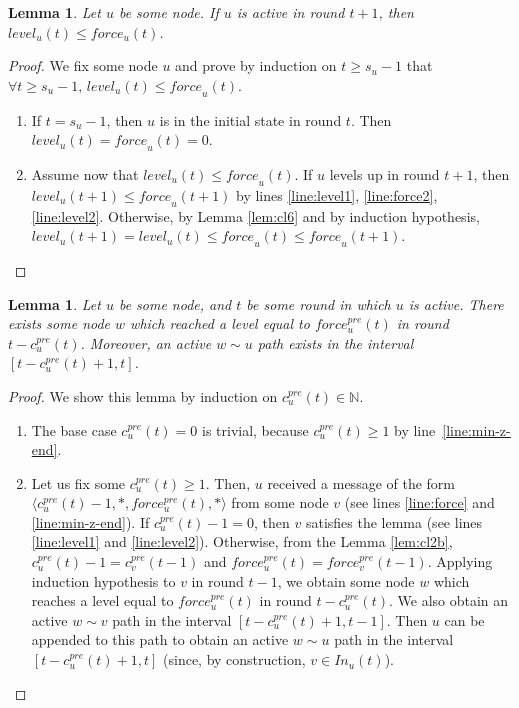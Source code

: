 \documentclass[11pt,letterpaper]{article}
\newtheorem{lem}[thm]{Lemma}
\begin{document}
\begin{lem} \label{lem:greater-force}
	Let $u$ be some node. If $u$ is active in round $t+1$, then $level_u(t) \leq force_u(t)$.
\end{lem}
\begin{proof}
        We fix some node $u$ and prove by induction on $t \geq s_u-1$ that $\forall t \geq s_u-1,\, \mathit{level}_u(t) \leq \mathit{force}_u(t)$.
	\begin{enumerate}
		\item If $t = s_u-1$, then $u$ is in the initial state in round $t$. Then $\mathit{level}_u(t) = \mathit{force}_u(t) = 0$.
		\item Assume now that $\mathit{level}_u(t) \leq \mathit{force}_u(t)$.
			If $u$ levels up in round $t+1$, then $\mathit{level}_u(t+1) \leq \mathit{force}_u(t+1)$ by lines \ref{line:level1}, \ref{line:force2}, \ref{line:level2}.
			Otherwise, by Lemma \ref{lem:cl6} and by induction hypothesis, $\mathit{level}_u(t+1) = \mathit{level}_u(t) \leq \mathit{force}_u(t) \leq \mathit{force}_u(t+1)$.
	\end{enumerate}
\end{proof}

\begin{lem} \label{lem:safety-force}
	Let $u$ be some node, and $t$ be some round in which $u$ is active.
	There exists some node $w$ which reached a level equal to $force_u^{pre}(t)$ in round $t-c_u^{pre}(t)$.
	Moreover, an active $w \sim u$ path exists in the interval $[t-c_u^{pre}(t)+1,t]$.
\end{lem}
\begin{proof}
	We show this lemma by induction on $c_u^{pre}(t) \in \mathds{N}$.
	\begin{enumerate}
		\item The base case $c_u^{pre}(t) = 0$ is trivial, because $c_u^{pre}(t) \geq 1$ by line~\ref{line:min-z-end}.
		\item Let us fix some $c_u^{pre}(t) \geq 1$.
			Then, $u$ received a message of the form $\langle c_u^{pre}(t)-1, *, force_u^{pre}(t), * \rangle$ from some node $v$ (see lines \ref{line:force} and \ref{line:min-z-end}).
			If $c_u^{pre}(t) - 1 = 0$, then $v$ satisfies the lemma (see lines \ref{line:level1} and \ref{line:level2}).
			Otherwise, from the Lemma \ref{lem:cl2b}, $c_u^{pre}(t)-1 = c_v^{pre}(t-1)$ and $force_u^{pre}(t) = force_v^{pre}(t-1)$.
			Applying induction hypothesis to $v$ in round $t-1$, we obtain some node $w$ which reaches a level equal to $force_u^{pre}(t)$ in round $t-c_u^{pre}(t)$.
			We also obtain an active $w \sim v$ path in the interval $[t-c_u^{pre}(t)+1,t-1]$.
			Then $u$ can be appended to this path to obtain an active $w \sim u$ path in the interval $[t-c_u^{pre}(t)+1,t]$ (since, by construction, $v \in In_u(t)$).
	\end{enumerate}
\end{proof}
\end{document}

